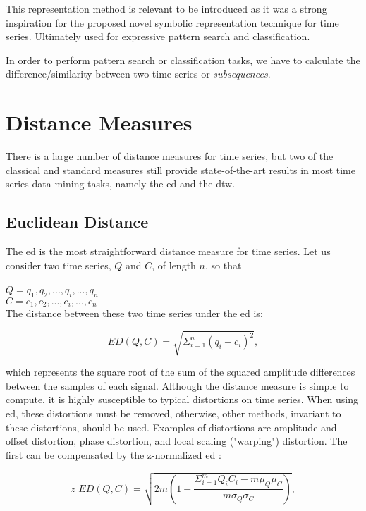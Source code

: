 This representation method is relevant to be introduced as it was a strong inspiration for the proposed novel symbolic representation technique for time series. Ultimately used for expressive pattern search and classification. 

In order to perform pattern search or classification tasks, we have to calculate the difference/similarity between two time series or \textit{subsequences}.

\section{Distance Measures}
\label{sec:distance}

There is a large number of distance measures for time series, but two of the classical and standard measures still provide state-of-the-art results in most time series data mining tasks, namely the \gls{ed} and the \gls{dtw}.

\subsection{Euclidean Distance}
\label{subsec:ed}

The \gls{ed} is the most straightforward distance measure for time series. Let us consider two time series, $Q$ and $C$, of length $n$, so that\\
\\
$Q = q_1, q_2, ..., q_i, ..., q_n$\\
$C = c_1, c_2, ..., c_i, ..., c_n$\\

The distance between these two time series under the \gls{ed} is:

\begin{equation}
ED(Q,C) = \sqrt{\Sigma^n_{i=1} (q_i - c_i)^2},
\end{equation}

which represents the square root of the sum of the squared amplitude differences between the samples of each signal. Although the distance measure is simple to compute, it is highly susceptible to typical distortions on time series. When using \gls{ed}, these distortions must be removed, otherwise, other methods, invariant to these distortions, should be used. Examples of distortions are amplitude and offset distortion, phase distortion, and local scaling ("warping") distortion. The first can be compensated by the z-normalized \gls{ed} \cite{complexity}:

\begin{equation}
\label{eq:norm_ed}
z\_ED(Q,C) = \sqrt{2m(1-\frac{\Sigma^m_{i=1}Q_iC_i - m\mu_Q\mu_C}{m\sigma_Q\sigma_C})},
\end{equation}


